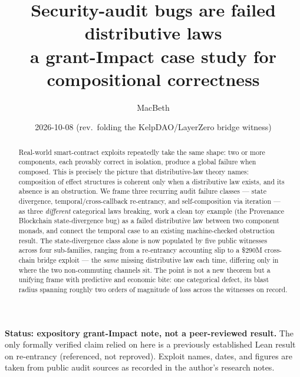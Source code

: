 \documentclass[11pt]{amsart}
\title[Security audits as failed distributive laws]{Security-audit bugs are failed
distributive laws\\ \normalsize a grant-Impact case study for compositional correctness}
\author{MacBeth}
\date{2026-10-08 (rev.\ folding the KelpDAO/LayerZero bridge witness)}
\theoremstyle{definition}
\theoremstyle{remark}
\begin{document}
\begin{abstract}
Real-world smart-contract exploits repeatedly take the same shape: two or more components,
each provably correct in isolation, produce a global failure when composed. This is precisely
the picture that distributive-law theory names: composition of effect structures is coherent
only when a distributive law exists, and its absence is an obstruction. We frame three recurring
audit failure classes --- state divergence, temporal/cross-callback re-entrancy, and
self-composition via iteration --- as three \emph{different} categorical laws breaking, work a
clean toy example (the Provenance Blockchain state-divergence bug) as a failed distributive law
between two component monads, and connect the temporal case to an existing machine-checked
obstruction result. The state-divergence class alone is now populated by five public witnesses
across four sub-families, ranging from a re-entrancy accounting slip to a \$290M cross-chain
bridge exploit --- the \emph{same} missing distributive law each time, differing only in where the
two non-commuting channels sit. The point is not a new theorem but a unifying frame with
predictive and economic bite: one categorical defect, its blast radius spanning roughly two orders
of magnitude of loss across the witnesses on record.
\end{abstract}

\maketitle

\begin{center}\small
{}
\end{center}

\medskip

\noindent\textbf{Status: expository grant-Impact note, not a peer-reviewed result.} The only
formally verified claim relied on here is a previously established Lean result on re-entrancy
(referenced, not reproved). Exploit names, dates, and figures are taken from public audit
sources as recorded in the author's research notes.
\end{document}
